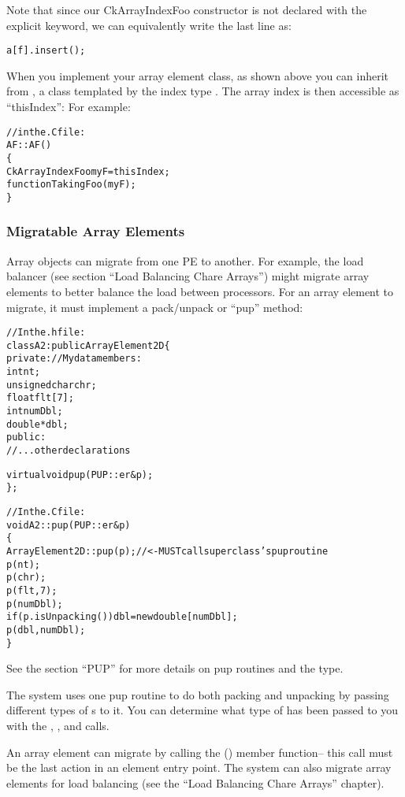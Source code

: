 Note that since our CkArrayIndexFoo constructor is not declared
with the explicit keyword, we can equivalently write the last line as:

\begin{alltt}
    a[f].insert();
\end{alltt}

When you implement your array element class, as shown above you 
can inherit from
, a class templated by the index type .
The array index is then accessible as ``thisIndex'':
For example:

\begin{alltt}

//in the .C file:
AF::AF()
\{
    CkArrayIndexFoo myF=thisIndex;
    functionTakingFoo(myF);
\}
\end{alltt}


\subsubsection{Migratable Array Elements}
Array objects can migrate from one PE to another.
For example, the load balancer (see section ``Load Balancing Chare Arrays'')
might migrate array elements to better balance the load between
processors.  For an array element to migrate, it must implement
a pack/unpack or ``pup'' method:

\begin{alltt}
//In the .h file:
class A2:public ArrayElement2D \{
private: //My data members:
    int nt;
    unsigned char chr;
    float flt[7];
    int numDbl;
    double *dbl;
public:	
    //...other declarations

    virtual void pup(PUP::er \&p);
\};

//In the .C file:
void A2::pup(PUP::er \&p)
\{
    ArrayElement2D::pup(p); //<- MUST call superclass's pup routine
    p(nt);
    p(chr);
    p(flt,7);
    p(numDbl);
    if (p.isUnpacking()) dbl=new double[numDbl];
    p(dbl,numDbl);
\}
\end{alltt}

See the  section ``PUP'' for more details on pup routines
and the  type.

The system uses one pup routine to do both packing and unpacking by
passing different types of s to it.  You can determine
what type of  has been passed to you with the
, , and  calls.

An array element can migrate by calling the () member function-- this call must be the last action
in an element entry point.  The system can also migrate array elements
for load balancing (see the ``Load Balancing Chare Arrays'' chapter).

